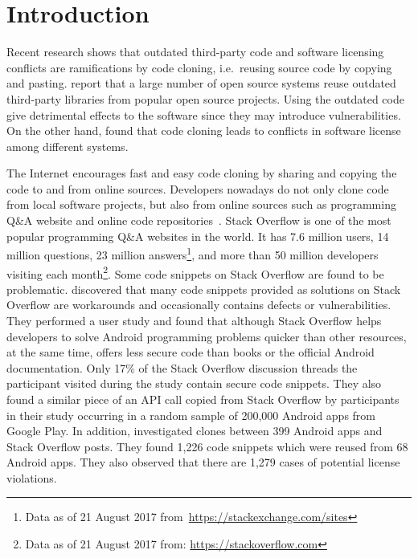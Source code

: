 \documentclass{svjour3}                     %
\begin{document}
\section{Introduction}

Recent research shows that outdated third-party code and software licensing
conflicts are ramifications by code cloning, i.e.~reusing source code by copying
and pasting. \cite{Xia2014} report that a large number of open source systems
reuse outdated third-party libraries from popular open source projects. Using
the outdated code give detrimental effects to the software since they may
introduce vulnerabilities. On the other hand, \cite{German2009} found that code
cloning leads to conflicts in software license among different systems.

The Internet encourages fast and easy code cloning by sharing and copying the
code to and from online sources. Developers nowadays do not only clone code from
local software projects, but also from online sources such as programming Q\&A
website and online code
repositories~\citep{Acar2016,Abdalkareem2017,An2017,Yang2017}. Stack Overflow is
one of the most popular programming Q\&A websites in the world. It has 7.6
million users, 14 million questions, 23 million answers\footnote{Data as of 21
	August 2017 from~\url{https://stackexchange.com/sites}}, and more than 50
million developers visiting each month\footnote{Data as of 21 August 2017 from:
	\url{https://stackoverflow.com}}. Some code snippets on Stack Overflow are found
to be problematic. \cite{Acar2016} discovered that many code snippets provided
as solutions on Stack Overflow are workarounds and occasionally contains defects
or vulnerabilities. They performed a user study and found that although Stack
Overflow helps developers to solve Android programming problems quicker than
other resources, at the same time, offers less secure code than books or the
official Android documentation. Only 17\% of the Stack Overflow discussion
threads the participant visited during the study contain secure code snippets.
They also found a similar piece of an API call copied from Stack Overflow by
participants in their study occurring in a random sample of 200,000 Android apps
from Google Play. In addition, \cite{An2017} investigated clones between 399
Android apps and Stack Overflow posts. They found 1,226 code snippets which were
reused from 68 Android apps. They also observed that there are 1,279 cases of
potential license violations.
\end{document}
